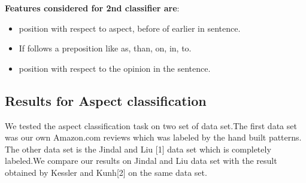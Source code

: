 \documentclass[12pt]{article}
\begin{document}
\textbf{Features considered for 2nd classifier are}: 
\begin{itemize}
\item position with respect to aspect, before of earlier in sentence.
\item If follows a preposition like as, than, on, in, to.
\item position with respect to the opinion in the sentence.

\end{itemize}

\subsection{Results for Aspect classification }
We tested the aspect classification task on two set of data set.The first data set was our own Amazon.com reviews which was labeled by the hand built patterns. The other data set is the Jindal and Liu [1] data set which is completely labeled.We compare our results on Jindal and Liu data set with the result obtained by Kessler and Kunh[2] on the same data set.\\
\end{document}
